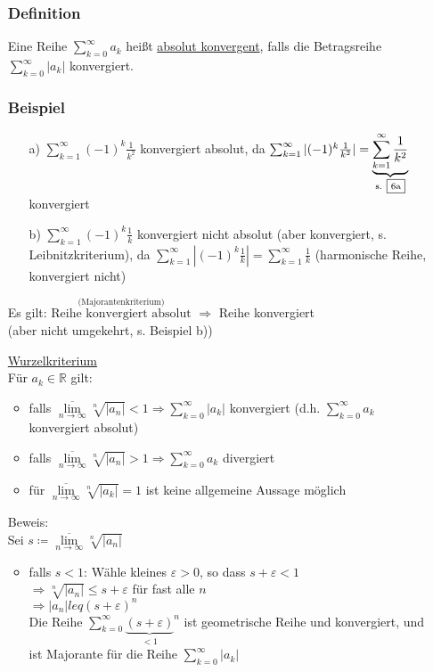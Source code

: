 \documentclass[12pt, titlepage]{article}
\newcommand{\R}{\mathds{R}}
\newcommand{\infn}{n\rightarrow\infty}
\renewcommand{\*}{\cdot}
\renewcommand{\epsilon}{\varepsilon}
\renewcommand{\limsup}[1]{\underset{#1}{\overline{\lim}}}
\begin{document}
\begin{itemize}
	\subsubsection*{Definition}
	Eine Reihe $\sum_{k=0}^{\infty}a_k$ heißt \underline{absolut konvergent}, falls die Betragsreihe $\sum_{k=0}^{\infty}|a_k|$ konvergiert.\\
	\subsubsection*{Beispiel}
	\begin{itemize}
		\item[a)] $\sum_{k=1}^{\infty}(-1)^k\frac{1}{k^2}$ konvergiert absolut, da $\sum_{k=1}^{\infty}|(-1)^k\frac{1}{k^2}|=\underbrace{\sum_{k=1}^{\infty}\frac{1}{k^2}}_{\textrm{s. \fbox{6a}}}$ konvergiert
		\item[b)] $\sum_{k=1}^{\infty}(-1)^k\frac{1}{k}$ konvergiert nicht absolut (aber konvergiert, s. Leibnitzkriterium), da $\sum_{k=1}^{\infty}|(-1)^k\frac{1}{k}|=\sum_{k=1}^{\infty}\frac{1}{k}$ (harmonische Reihe, konvergiert nicht)
	\end{itemize}
	Es gilt: $\overset{\textrm{(Majorantenkriterium)}}{\textrm{Reihe konvergiert absolut}}$ $\Rightarrow$ Reihe konvergiert\\
	(aber nicht umgekehrt, s. Beispiel b))
	\item[\fbox{6a}] \underline{Wurzelkriterium}\\
	Für $a_k\in\R$ gilt:
	\begin{itemize}
		\item falls $\limsup{\infn}\sqrt[n]{|a_n|}<1\Rightarrow\sum_{k=0}^{\infty}|a_k|$ konvergiert (d.h. $\sum_{k=0}^{\infty}a_k$ konvergiert absolut)
		\item falls $\limsup{\infn}\sqrt[n]{|a_n|}>1\Rightarrow\sum_{k=0}^{\infty}a_k$ divergiert
		\item für $\limsup{\infn}\sqrt[n]{|a_k|}=1$ ist keine allgemeine Aussage möglich
	\end{itemize}
	Beweis:\\
	Sei $s\coloneqq\limsup{\infn}\sqrt[n]{|a_n|}$
	\begin{itemize}
		\item falls $s<1$: Wähle kleines $\epsilon>0$, so dass $s+\epsilon<1$\\
		$\Rightarrow\sqrt[n]{|a_n|}\leq s+\epsilon$ für fast alle $n$\\
		$\Rightarrow|a_n|leq(s+\epsilon)^n$\\
		Die Reihe $\sum_{k=0}^{\infty}{\underbrace{(s+\epsilon)}_{<1}}^n$ ist geometrische Reihe und konvergiert, und ist Majorante für die Reihe $\sum_{k=0}^{\infty}|a_k|$

\end{itemize}
\end{itemize}
\end{document}
